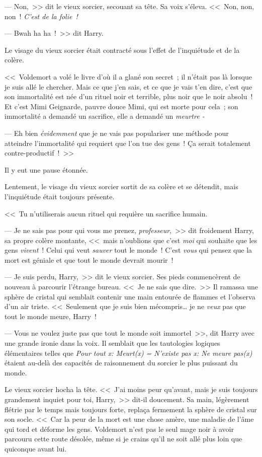 --- Non,~>> dit le vieux sorcier, secouant sa tête. Sa voix s'éleva. <<~Non, non, non~! \emph{C'est de la folie~!}

--- Bwah ha ha~!~>> dit Harry.

Le visage du vieux sorcier était contracté sous l'effet de l'inquiétude et de la colère.

<<~Voldemort a volé le livre d'où il a glané son secret~; il n'était pas là lorsque je suis allé le chercher. Mais ce que j'en sais, et ce que je vais t'en dire, c'est que son immortalité est née d'un rituel noir et terrible, plus noir que le noir absolu~! Et c'est Mimi Geignarde, pauvre douce Mimi, qui est morte pour cela~; son immortalité a demandé un sacrifice, elle a demandé un \emph{meurtre -}

--- Eh bien \emph{évidemment} que je ne vais pas populariser une méthode pour atteindre l'immortalité qui requiert que l'on tue des gens~! Ça serait totalement contre-productif~!~>>

Il y eut une pause étonnée.

Lentement, le visage du vieux sorcier sortit de sa colère et se détendit, mais l'inquiétude était toujours présente.

<<~Tu n'utiliserais aucun rituel qui requière un sacrifice humain.

--- Je ne sais pas pour qui vous me prenez, \emph{professeur},~>> dit froidement Harry, sa propre colère montante, <<~mais n'oublions que c'est \emph{moi} qui souhaite que les gens \emph{vivent}~! Celui qui veut \emph{sauver} tout le monde~! C'est \emph{vous} qui pensez que la mort est géniale et que tout le monde devrait mourir~!

--- Je suis perdu, Harry,~>> dit le vieux sorcier. Ses pieds commencèrent de nouveau à parcourir l'étrange bureau. <<~Je ne sais que dire.~>> Il ramassa une sphère de cristal qui semblait contenir une main entourée de flammes et l'observa d'un air triste. <<~Seulement que je suis bien mécompris… je ne \emph{veux} pas que tout le monde meure, Harry~!

--- Vous ne voulez juste pas que tout le monde soit immortel~>>, dit Harry avec une grande ironie dans la voix. Il semblait que les tautologies logiques élémentaires telles que \emph{Pour tout x: Meurt(x) = N'existe pas x: Ne meure pas(x)} étaient au-delà des capacités de raisonnement du sorcier le plus puissant du monde.

Le vieux sorcier hocha la tête. <<~J'ai moins peur qu'avant, mais je suis toujours grandement inquiet pour toi, Harry,~>> dit-il doucement. Sa main, légèrement flétrie par le temps mais toujours forte, replaça fermement la sphère de cristal sur son socle. <<~Car la peur de la mort est une chose amère, une maladie de l'âme qui tord et déforme les gens. Voldemort n'est pas le seul mage noir à avoir parcouru cette route désolée, même si je crains qu'il ne soit allé plus loin que quiconque avant lui.


